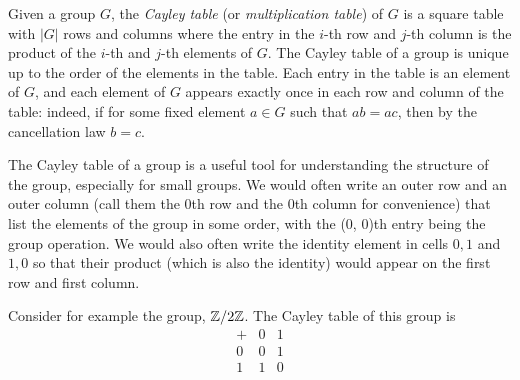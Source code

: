 \begin{example}
    Given a group \(G\), the \emph{Cayley table} (or \emph{multiplication
    table}) of \(G\) is a square table with \(|G|\) rows and columns where the
    entry in the \(i\)-th row and \(j\)-th column is the product of the \(i\)-th
    and \(j\)-th elements of \(G\). The Cayley table of a group is unique up to
    the order of the elements in the table. Each entry in the table is an
    element of \(G\), and each element of \(G\) appears exactly once in each row
    and column of the table: indeed, if for some fixed element \(a \in G\) such
    that \(ab = ac\), then by the cancellation law \(b = c\).
    
    The Cayley table of a group is a useful tool for understanding the structure
    of the group, especially for small groups. We would often write an outer row
    and an outer column (call them the 0th row and the 0th column for
    convenience) that list the elements of the group in some order, with the (0,
    0)th entry being the group operation. We would also often write the identity
    element in cells \(0, 1\) and \(1, 0\) so that their product (which is also
    the identity) would appear on the first row and first column.

    Consider for example the group, \(\mathbb{Z}/2\mathbb{Z}\). The Cayley table of this group
    is
    \[
        \begin{array}{c|cc}
            + & 0 & 1\\
            \hline
            0 & 0 & 1\\
            1 & 1 & 0
        \end{array}
    \]


\end{example}
